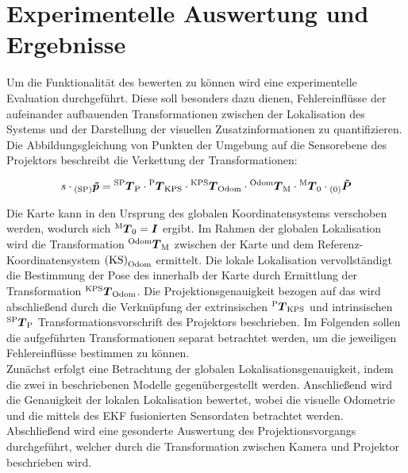 \chapter{Experimentelle Auswertung und Ergebnisse}
\label{chap.results}
\prever{
}


Um die Funktionalität des  bewerten zu können wird eine experimentelle Evaluation durchgeführt. Diese soll besonders dazu dienen, Fehlereinflüsse der aufeinander aufbauenden Transformationen zwischen der Lokalisation des Systems und der Darstellung der visuellen Zusatzinformationen zu quantifizieren. Die Abbildungsgleichung von Punkten der Umgebung auf die Sensorebene des Projektors beschreibt die Verkettung der Transformationen:

\begin{equation}
s \cdot {_{{\mathrm{(SP)}}}}\mbox{\boldmath{$\tilde{p}$}} = {^{\mathrm{SP}}\mbox{\boldmath{$T$}}_{\mathrm{P}}}\cdot{^{\mathrm{P}}\mbox{\boldmath{$T$}}_{\mathrm{KPS}}}\cdot{^{\mathrm{KPS}}\mbox{\boldmath{$T$}}_{\mathrm{Odom}}}\cdot{^{\mathrm{Odom}}\mbox{\boldmath{$T$}}_{\mathrm{M}}}\cdot{^{\mathrm{M}}\mbox{\boldmath{$T$}}_{\mathrm{0}}}\cdot{_{{\mathrm{(0)}}}}\mbox{\boldmath{$\tilde{P}$}}
\end{equation}

Die Karte kann in den Ursprung des globalen Koordinatensystems verschoben werden, wodurch sich ${^{\mathrm{M}}\mbox{\boldmath{$T$}}_{\mathrm{0}}} = \mbox{\boldmath{$I$}}$ ergibt. Im Rahmen der globalen Lokalisation wird die Transformation ${^{\mathrm{Odom}}\mbox{\boldmath{$T$}}_{\mathrm{M}}}$ zwischen der Karte und dem Referenz-Koordinatensystem ${\mathrm{(KS)}}_{\mathrm{Odom}}$ ermittelt. Die lokale Lokalisation vervollständigt die Bestimmung der Pose des  innerhalb der Karte durch Ermittlung der Transformation ${^{\mathrm{KPS}}\mbox{\boldmath{$T$}}_{\mathrm{Odom}}}$. Die Projektionsgenauigkeit bezogen auf das \kps{} wird abschließend durch die Verknüpfung der extrinsischen ${^{\mathrm{P}}\mbox{\boldmath{$T$}}_{\mathrm{KPS}}}$ und intrinsischen ${^{\mathrm{SP}}\mbox{\boldmath{$T$}}_{\mathrm{P}}}$ Transformationsvorschrift des Projektors beschrieben. Im Folgenden sollen die aufgeführten Transformationen separat betrachtet werden, um die jeweiligen Fehlereinflüsse bestimmen zu können.\\

\prever{
}
Zunächst erfolgt eine Betrachtung der globalen Lokalisationsgenauigkeit, indem die zwei in  beschriebenen Modelle gegenübergestellt werden. Anschließend wird die Genauigkeit der lokalen Lokalisation bewertet, wobei die visuelle Odometrie und die mittels des EKF fusionierten Sensordaten betrachtet werden. Abschließend wird eine gesonderte Auswertung des Projektionsvorgangs durchgeführt, welcher durch die Transformation zwischen Kamera und Projektor beschrieben wird.\\

